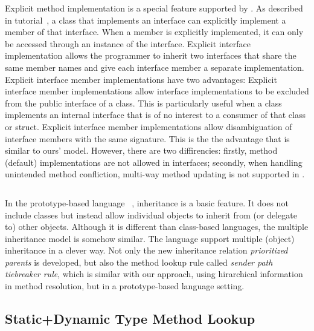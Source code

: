 Explicit method implementation is a special feature supported by \csharp. As described in \csharp
tutorial~\cite{}, a class that implements an interface can explicitly implement a member of that
interface. When a member is explicitly implemented, it can only be accessed through an instance
of the interface. Explicit interface implementation allows the programmer to inherit two interfaces 
that share the same member names and give each interface member a separate implementation. 
Explicit interface member implementations have two advantages:
Explicit interface member implementations allow interface implementations to be excluded 
from the public interface of a class. This is particularly useful when a class implements an internal 
interface that is of no interest to a consumer of that class or struct.
Explicit interface member implementations allow disambiguation of interface members with the 
same signature. This is the the advantage that is similar to ours' model. However, there are two 
diffirencies: firstly, method (default) implementations are not allowed in \csharp interfaces; 
secondly, when handling unintended method confliction, multi-way method updating is not supported 
in \csharp.

\begin{lstlisting}
\end{lstlisting}

 In the prototype-based language \self~\cite{Chambers1991}, inheritance is a basic feature.
It does not include classes but instead allow individual objects to inherit from (or delegate to) other objects. 
Although it is different than class-based languages, the multiple inheritance model is somehow similar. The \self 
language support multiple (object) inheritance in a clever way. Not only the new inheritance
relation \emph{prioritized parents} is developed, but also the method lookup rule called 
\emph{sender path tiebreaker rule}, which is similar with our approach, using hirarchical 
information in method resolution, but in a prototype-based language setting.

\subsection{Static+Dynamic Type Method Lookup}

